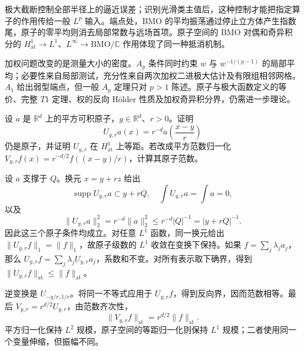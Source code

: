 \begin{chaptersummary}
极大截断控制全部半径上的逼近误差；识别光滑类主值后，这种控制才能把指定算子的作用传给一般 \(L^p\) 输入。端点处，BMO 的平均振荡通过停止立方体产生指数尾，原子的零平均则消去局部常数与远场首项。原子空间的 BMO 对偶和奇异积分的 \(H^1_{\mathrm{at}}\to L^1\)、\(L^\infty\to\mathrm{BMO}/\mathbb C\) 作用体现了同一种抵消机制。

\ProseParagraphBreak

加权问题改变的是测量大小的密度。\(A_p\) 条件同时约束 \(w\) 与 \(w^{-1/(p-1)}\) 的局部平均；必要性来自局部测试，充分性来自两次加权二进极大估计及有限组相邻网格。\(A_1\) 给出弱型端点，但一般 \(A_p\) 定理只对 \(p>1\) 陈述。原子与极大函数定义的等价、完整 \(T1\) 定理、权的反向 Hölder 性质及加权奇异积分界，仍需进一步理论。
\end{chaptersummary}

\BookExercises

\begin{exercise}\label{b2:ex:app-C-1}
设 \(a\) 是 \(\mathbb R^d\) 上的平方可积原子，\(y\in\mathbb R^d\)、\(r>0\)。证明
\[
 U_{y,r}a(x)=r^{-d}a\left(\frac{x-y}{r}\right)
\]
仍是原子，并证明 \(U_{y,r}\) 在 \(H^1_{\mathrm{at}}\) 上等距。若改成平方范数归一化 \(V_{y,r}f(x)=r^{-d/2}f((x-y)/r)\)，计算其原子范数。
\end{exercise}
\begin{solution}
设 \(a\) 支撑于 \(Q\)。换元 \(x=y+rz\) 给出
\[
 \operatorname{supp}U_{y,r}a\subset y+rQ,\quad
 \int U_{y,r}a=\int a=0,
\]
以及
\[
 \|U_{y,r}a\|_2^2=r^{-d}\|a\|_2^2
 \leq r^{-d}|Q|^{-1}=|y+rQ|^{-1}.
\]
因此这三个原子条件均成立。对任意 \(L^1\) 函数，同一换元给出 \(\|U_{y,r}f\|_1=\|f\|_1\)，故原子级数的 \(L^1\) 收敛在变换下保持。如果 \(f=\sum_j\lambda_ja_j\)，那么 \(U_{y,r}f=\sum_j\lambda_jU_{y,r}a_j\)，系数和不变。对所有表示取下确界，得到
\(\|U_{y,r}f\|_{\mathrm{at}}\leq\|f\|_{\mathrm{at}}\)。

逆变换是 \(U_{-y/r,1/r}\)。将同一不等式应用于 \(U_{y,r}f\)，得到反向界，因而范数相等。最后 \(V_{y,r}=r^{d/2}U_{y,r}\)，由范数齐次性，
\[
 \|V_{y,r}f\|_{\mathrm{at}}=r^{d/2}\|f\|_{\mathrm{at}}.
\]
平方归一化保持 \(L^2\) 规模，原子空间的等距归一化则保持 \(L^1\) 规模；二者使用同一个变量伸缩，但振幅不同。
\end{solution}

